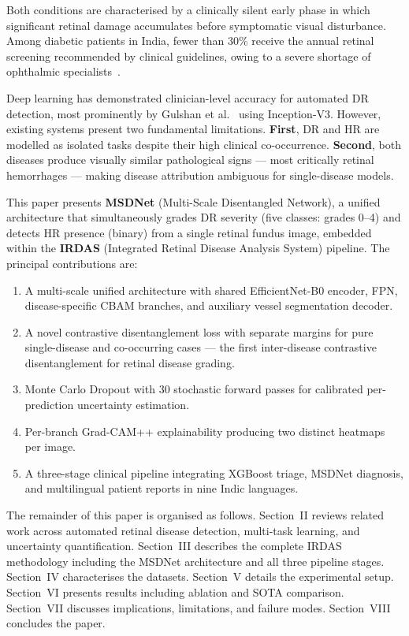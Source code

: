 \documentclass[conference]{IEEEtran}
\begin{document}
Both conditions are characterised by a clinically silent early phase in which significant retinal damage accumulates before symptomatic visual disturbance. Among diabetic patients in India, fewer than 30\% receive the annual retinal screening recommended by clinical guidelines, owing to a severe shortage of ophthalmic specialists~\cite{raman2019}.

Deep learning has demonstrated clinician-level accuracy for automated DR detection, most prominently by Gulshan et al.~\cite{gulshan2016} using Inception-V3. However, existing systems present two fundamental limitations. \textbf{First}, DR and HR are modelled as isolated tasks despite their high clinical co-occurrence. \textbf{Second}, both diseases produce visually similar pathological signs --- most critically retinal hemorrhages --- making disease attribution ambiguous for single-disease models.

This paper presents \textbf{MSDNet} (Multi-Scale Disentangled Network), a unified architecture that simultaneously grades DR severity (five classes: grades 0--4) and detects HR presence (binary) from a single retinal fundus image, embedded within the \textbf{IRDAS} (Integrated Retinal Disease Analysis System) pipeline. The principal contributions are:

\begin{enumerate}
    \item A multi-scale unified architecture with shared EfficientNet-B0 encoder, FPN, disease-specific CBAM branches, and auxiliary vessel segmentation decoder.
    \item A novel contrastive disentanglement loss with separate margins for pure single-disease and co-occurring cases --- the first inter-disease contrastive disentanglement for retinal disease grading.
    \item Monte Carlo Dropout with 30 stochastic forward passes for calibrated per-prediction uncertainty estimation.
    \item Per-branch Grad-CAM++ explainability producing two distinct heatmaps per image.
    \item A three-stage clinical pipeline integrating XGBoost triage, MSDNet diagnosis, and multilingual patient reports in nine Indic languages.
\end{enumerate}

The remainder of this paper is organised as follows. Section~II reviews related work across automated retinal disease detection, multi-task learning, and uncertainty quantification. Section~III describes the complete IRDAS methodology including the MSDNet architecture and all three pipeline stages. Section~IV characterises the datasets. Section~V details the experimental setup. Section~VI presents results including ablation and SOTA comparison. Section~VII discusses implications, limitations, and failure modes. Section~VIII concludes the paper.
\end{document}
